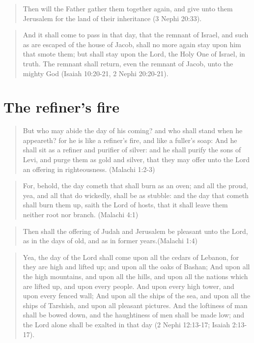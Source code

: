 \begin{quotation}
Then will the Father gather them together again, and give unto them Jerusalem for the land of their inheritance (3 Nephi 20:33).
\end{quotation}

\begin{quotation}
And it shall come to pass in that day, that the remnant of Israel, and such as are escaped of the house of Jacob, shall no more again stay upon him that smote them; but shall stay upon the Lord, the Holy One of Israel, in truth. The remnant shall return, even the remnant of Jacob, unto the mighty God (Isaiah 10:20-21, 2 Nephi 20:20-21).
\end{quotation}

\section{The refiner's fire}

\begin{quotation}
But who may abide the day of his coming? and who shall stand when he appeareth? for he is like a refiner's fire, and like a fuller's soap: And he shall sit as a refiner and purifier of silver: and he shall purify the sons of Levi, and purge them as gold and silver, that they may offer unto the Lord an offering in righteousness. (Malachi 1:2-3)
\end{quotation}

\begin{quotation}
For, behold, the day cometh that shall burn as an oven; and all the proud, yea, and all that do wickedly, shall be as stubble: and the day that cometh shall burn them up, saith the Lord of hosts, that it shall leave them neither root nor branch. (Malachi 4:1)
\end{quotation}

\begin{quotation}
Then shall the offering of Judah and Jerusalem be pleasant unto the Lord, as in the days of old, and as in former years.(Malachi 1:4)
\end{quotation}

\begin{quotation}
Yea, the day of the Lord shall come upon all the cedars of Lebanon, for they are high and lifted up; and upon all the oaks of Bashan; And upon all the high mountains, and upon all the hills, and upon all the nations which are lifted up, and upon every people. And upon every high tower, and upon every fenced wall; And upon all the ships of the sea, and upon all the ships of Tarshish, and upon all pleasant pictures. And the loftiness of man shall be bowed down, and the haughtiness of men shall be made low; and the Lord alone shall be exalted in that day (2 Nephi 12:13-17; Isaiah 2:13-17).
\end{quotation}

